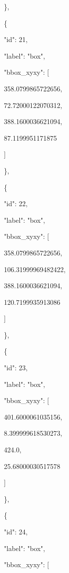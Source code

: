 \documentclass[10pt,a4paper]{article}
\begin{document}
    \},\allowbreak{}\par
    \{\par
      "id":\allowbreak{} 21,\allowbreak{}\par
      "label":\allowbreak{} "box",\allowbreak{}\par
      "bbox\_xyxy":\allowbreak{} [\par
        358.0799865722656,\allowbreak{}\par
        72.72000122070312,\allowbreak{}\par
        388.1600036621094,\allowbreak{}\par
        87.1199951171875\par
      ]\par
    \},\allowbreak{}\par
    \{\par
      "id":\allowbreak{} 22,\allowbreak{}\par
      "label":\allowbreak{} "box",\allowbreak{}\par
      "bbox\_xyxy":\allowbreak{} [\par
        358.0799865722656,\allowbreak{}\par
        106.31999969482422,\allowbreak{}\par
        388.1600036621094,\allowbreak{}\par
        120.7199935913086\par
      ]\par
    \},\allowbreak{}\par
    \{\par
      "id":\allowbreak{} 23,\allowbreak{}\par
      "label":\allowbreak{} "box",\allowbreak{}\par
      "bbox\_xyxy":\allowbreak{} [\par
        401.6000061035156,\allowbreak{}\par
        8.399999618530273,\allowbreak{}\par
        424.0,\allowbreak{}\par
        25.68000030517578\par
      ]\par
    \},\allowbreak{}\par
    \{\par
      "id":\allowbreak{} 24,\allowbreak{}\par
      "label":\allowbreak{} "box",\allowbreak{}\par
      "bbox\_xyxy":\allowbreak{} [\par
\end{document}

